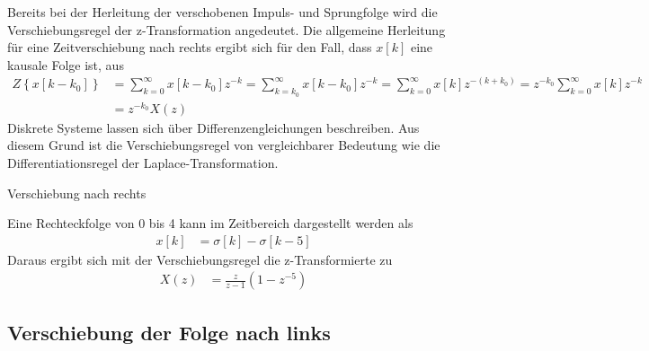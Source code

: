 Bereits bei der Herleitung der verschobenen Impuls- und Sprungfolge wird die Verschiebungsregel der z-Transformation angedeutet. Die allgemeine Herleitung für eine Zeitverschiebung nach rechts ergibt sich für den Fall, dass \(x[k]\) eine kausale Folge ist, aus
\begin{align}
{\boldsymbol{\mathit{Z}}\left\{x\left[k-k_{0} \right]\right\}} &=  {\sum\limits _{k=0}^{\infty }x\left[k-k_{0} \right] z^{-k}  =\sum\limits _{k=k_{0} }^{\infty }x\left[k-k_{0} \right] z^{-k}  =\sum\limits _{k=0}^{\infty }x[k] z^{-(k+k_{0} )}  =z^{-k_{0} }  \sum\limits _{k=0}^{\infty }x[k] z^{-k}  } \\
{} &=  {z^{-k_{0} }  X(z)}
\label{eq:5.41}
\end{align}
Diskrete Systeme lassen sich über Differenzengleichungen beschreiben. Aus diesem Grund ist die Verschiebungsregel von vergleichbarer Bedeutung wie die Differentiationsregel der Laplace-Transformation.

\begin{example}{Verschiebung nach rechts}
\label{example:beispiel-verschiebung-nach-rechts}

Eine Rechteckfolge von 0 bis 4 kann im Zeitbereich dargestellt werden als
\begin{align*}
x[ k] &= \sigma[ k] - \sigma[ k - 5] 
\end{align*}
Daraus ergibt sich mit der Verschiebungsregel die z-Transformierte zu
\begin{align*}
X(z) &= \frac{z}{z - 1}  \left( 1 - z^{- 5} \right) 
\end{align*}
\end{example}

\subsection{Verschiebung der Folge nach links}\label{sec:verschiebung-der-folge-nach-links}

